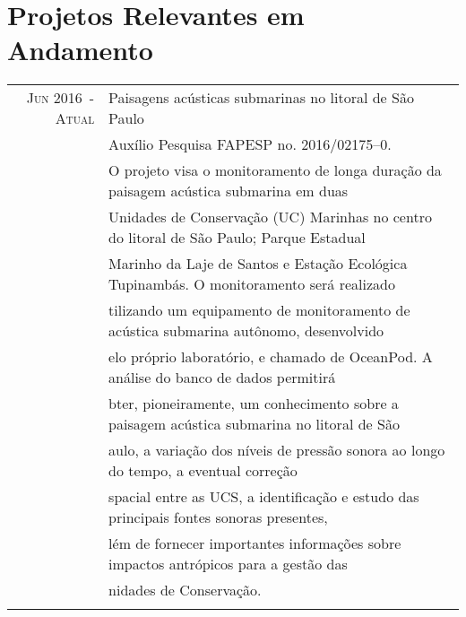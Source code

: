 \documentclass[a4paper,10pt]{article}
\begin{document}
\section{Projetos Relevantes em Andamento}
\begin{tabular}{rl}

    \textsc{Jun 2016~-~Atual}   & Paisagens acústicas submarinas no litoral de São Paulo\\
                                &\footnotesize{Auxílio Pesquisa FAPESP no. 2016/02175--0.}\\
                                &\footnotesize{O projeto visa o monitoramento de longa duração da paisagem acústica submarina em duas}\\ 
                                &\footnotesize{Unidades de Conservação (UC) Marinhas no centro do litoral de São Paulo; Parque Estadual}\\  
                                &\footnotesize{Marinho da Laje de Santos e Estação Ecológica Tupinambás. O monitoramento será realizado}\\ 
                                &\footnotesize{tilizando um equipamento de monitoramento de acústica submarina autônomo, desenvolvido}\\ 
                                &\footnotesize{elo próprio laboratório, e chamado de OceanPod. A análise do banco de dados permitirá}\\ 
                                &\footnotesize{bter, pioneiramente, um conhecimento sobre a paisagem acústica submarina no litoral de São}\\
                                &\footnotesize{aulo, a variação dos níveis de pressão sonora ao longo do tempo, a eventual correção}\\ 
                                &\footnotesize{spacial entre as UCS, a identificação e estudo das principais fontes sonoras presentes,}\\ 
                                &\footnotesize{lém de fornecer importantes informações sobre impactos antrópicos para a gestão das}\\ 
                                &\footnotesize{nidades de Conservação.}\\
                                &\\
\end{tabular}
\end{document}
